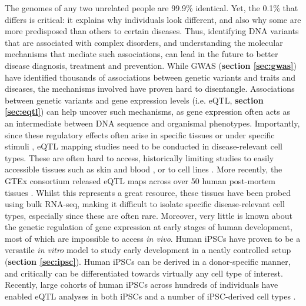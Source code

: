 The genomes of any two unrelated people are 99.9\% identical.
Yet, the 0.1\% that differs is critical: it explains why individuals look different, and also why some are more predisposed than others to certain diseases. 
Thus, identifying DNA variants that are associated with complex disorders, and understanding the molecular mechanisms that mediate such associations, can lead in the future to better disease diagnosis, treatment and prevention.
While GWAS (\textbf{section \ref{sec:gwas}}) have identified thousands of associations between genetic variants and traits and diseases, the mechanisms involved have proven hard to disentangle.
Associations between genetic variants and gene expression levels (i.e. eQTL, \textbf{section 
\ref{sec:eqtl}}) can help uncover such mechanisms, as gene expression often acts as an intermediate between DNA sequence and organismal phenotypes.
Importantly, since these regulatory effects often arise in specific tissues or under specific stimuli \cite{alasoo2018shared}, eQTL mapping studies need to be conducted in disease-relevant cell types. 
These are often hard to access, historically limiting studies to easily accessible tissues such as skin and blood \cite{fairfax2014innate, westra2014genome}, or to cell lines \cite{gibson2005quantitative}.
More recently, the GTEx consortium released eQTL maps across over 50 human post-mortem tissues \cite{aguet2019gtex}.
Whilst this represents a great resource, 
these tissues have been probed using bulk RNA-seq, making it difficult to isolate specific disease-relevant cell types, especially since these are often rare.
Moreover, 
very little is known about the genetic regulation of gene expression at early stages of human development, most of which are impossible to access \textit{in vivo}.
Human iPSCs have proven to be a versatile \textit{in vitro} model to study early development in a neatly controlled setup (\textbf{section 
\ref{sec:ipsc}}).
Human iPSCs can be derived in a donor-specific manner, and critically can be differentiated towards virtually any cell type of interest.
Recently, large cohorts of human iPSCs across hundreds of individuals have enabled eQTL analyses in both iPSCs and a number of iPSC-derived cell types \cite{kilpinen2017common, schwartzentruber2018molecular}. 


